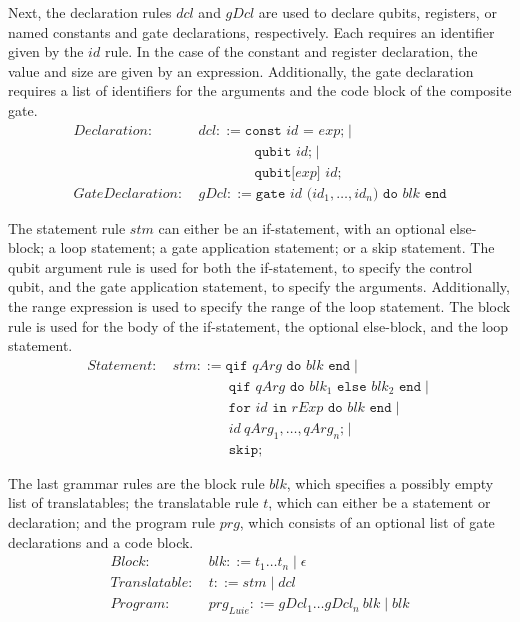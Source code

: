 Next, the declaration rules $dcl$ and $gDcl$ are used to declare qubits, registers, or named constants and gate declarations, respectively. Each requires an identifier given by the $id$ rule. In the case of the constant and register declaration, the value and size are given by an expression. Additionally, the gate declaration requires a list of identifiers for the arguments and the code block of the composite gate.
\begin{align*}
    Declaration: \ & dcl ::= \texttt{const } id \texttt{ = } exp \texttt{;} \mid \\
                 & \quad \quad \quad \quad \texttt{qubit } id \texttt{;} \mid \\
                 & \quad \quad \quad \quad \texttt{qubit[} exp \texttt{] } id \texttt{;}\\
    GateDeclaration: \ & gDcl::= \texttt{gate } id \texttt{ (}id_1, \dots, id_n\texttt{) do } blk \texttt{ end}
\end{align*}

The statement rule $stm$ can either be an if-statement, with an optional else-block; a loop statement; a gate application statement; or a skip statement. The qubit argument rule is used for both the if-statement, to specify the control qubit, and the gate application statement, to specify the arguments. Additionally, the range expression is used to specify the range of the loop statement. The block rule is used for the body of the if-statement, the optional else-block, and the loop statement.
\begin{align*}
    Statement: \ & stm ::= \texttt{qif } qArg \texttt{ do }  blk \texttt{ end} \mid\\
                 & \quad \quad \quad \quad \texttt{qif } qArg \texttt{ do }  blk_1 \texttt{ else } blk_2 \texttt{ end} \mid\\
                 & \quad \quad \quad \quad \texttt{for } id \texttt{ in } rExp \texttt{ do } blk \texttt{ end} \mid \\
                 & \quad \quad \quad \quad id \ qArg_1, \dots, qArg_n \texttt{;} \mid \\
                 & \quad \quad \quad \quad \texttt{skip;}
\end{align*}

The last grammar rules are the block rule $blk$, which specifies a possibly empty list of translatables; the translatable rule $t$, which can either be a statement or declaration; and the program rule $prg$, which consists of an optional list of gate declarations and a code block.
\begin{align*}
    Block: \ & blk::= t_1 \dots t_n \mid \epsilon\\
    Translatable : \ & t::= stm \mid dcl\\
    Program: \ & prg_{Luie} ::= gDcl_1 \dots gDcl_n \ blk \mid blk 
\end{align*}

